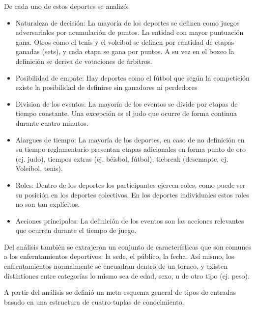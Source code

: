     De cada uno de estos deportes se analizó:

    \begin{itemize}
        \item Naturaleza de decisión: La mayoría de los deportes se definen como juegos 
        adversariales por acumulación de puntos. La entidad con mayor puntuación gana. Otros como el tenis y el voleibol 
        se definen por cantidad de etapas ganadas (sets), y cada etapa se gana por puntos. A su vez en el boxeo la definición 
        se deriva de votaciones de árbitros.
        \item Posibilidad de empate: Hay deportes como el fútbol que según la competición existe la posibilidad de 
        definirse sin ganadores ni perdedores
        \item Division de los eventos: La mayoría de los eventos se divide por etapas de tiempo
        constante. Una excepción es el judo que ocurre de forma continua durante cuatro minutos. 
        \item Alargues de tiempo: La mayoría de los deportes, en caso de no definición en su tiempo reglamentario presentan 
        etapas adicionales en forma punto de oro (ej. judo),  tiempos extras (ej. béisbol, fútbol), tiebreak (desemapte, ej. Voleibol, tenis).
        \item Roles: Dentro de los deportes los participantes ejercen roles, como puede ser su posición en los deportes colectivos. En los deportes 
        individuales estos roles no son tan explícitos.
        \item  Acciones principales: La definición de los eventos son las acciones relevantes que ocurren durante el tiempo de juego.
    \end{itemize}

    Del análisis también se extrajeron un conjunto de características que son comunes a los enferntamientos deportivos: la sede, 
el público, la fecha. Así mismo, los enfrentamientos normalmente se encuadran dentro de un torneo, y existen distintiones entre categorías lo mismo sea 
de edad, sexo, u de otro tipo (ej. peso).

    A partir del análisis se definió un meta esquema general de tipos de entradas basado en una estructura de 
cuatro-tuplas de conocimiento.

